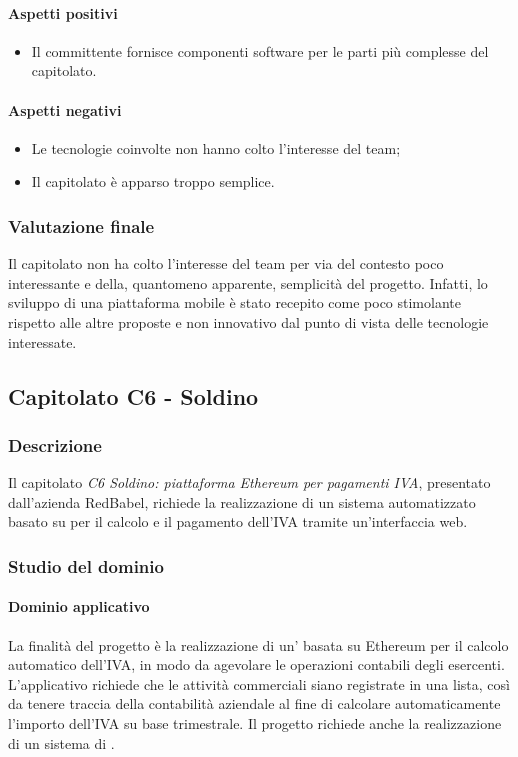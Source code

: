 \paragraph{Aspetti positivi}
\begin{itemize}
	\item Il committente fornisce componenti software per le parti più complesse del capitolato.
\end{itemize}
\paragraph{Aspetti negativi}
\begin{itemize}
	\item Le tecnologie coinvolte non hanno colto l'interesse del team;
	\item Il capitolato è apparso troppo semplice.
\end{itemize}
\subsubsection{Valutazione finale}
Il capitolato non ha colto l'interesse del team per via del contesto poco interessante e della, quantomeno apparente, semplicità del progetto. Infatti, lo 				sviluppo di una piattaforma mobile è stato recepito come poco stimolante rispetto alle altre proposte e non innovativo dal punto di vista delle tecnologie 					interessate. 
		
		
	\subsection{Capitolato C6 - Soldino}
		\subsubsection{Descrizione}
		Il capitolato \emph{C6 Soldino: piattaforma Ethereum per pagamenti IVA}, presentato dall'azienda RedBabel, richiede la realizzazione di un sistema automatizzato basato su  per il calcolo e il pagamento dell'IVA tramite un'interfaccia web.
		\subsubsection{Studio del dominio}
			\paragraph{Dominio applicativo} \Spazio
			La finalità del progetto è la realizzazione di un’ basata su Ethereum per il calcolo automatico dell’IVA, in modo da agevolare le operazioni contabili degli esercenti. L'applicativo richiede che le attività commerciali siano registrate in una lista, così da tenere traccia della contabilità aziendale al fine di calcolare automaticamente l'importo dell'IVA su base trimestrale. Il progetto richiede anche la realizzazione di un sistema di .
			
